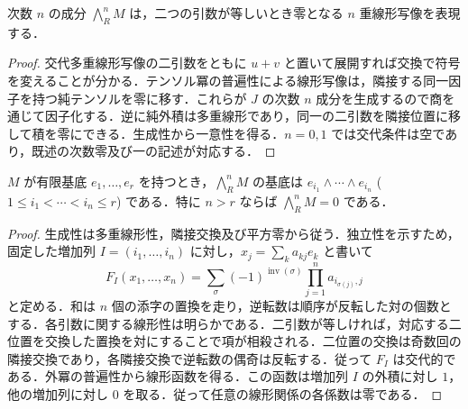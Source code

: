 \begin{prop}[外冪の普遍性]
次数 $n$ の成分 $\bigwedge_R^n M$ は，二つの引数が等しいとき零となる $n$ 重線形写像を表現する．
\end{prop}
\begin{proof}
交代多重線形写像の二引数をともに $u+v$ と置いて展開すれば交換で符号を変えることが分かる．テンソル冪の普遍性による線形写像は，隣接する同一因子を持つ純テンソルを零に移す．これらが $J$ の次数 $n$ 成分を生成するので商を通じて因子化する．逆に純外積は多重線形であり，同一の二引数を隣接位置に移して積を零にできる．生成性から一意性を得る．$n=0,1$ では交代条件は空であり，既述の次数零及び一の記述が対応する．
\end{proof}
\begin{prop}[自由加群の外冪の基底]
$M$ が有限基底 $e_1,\ldots,e_r$ を持つとき，$\bigwedge_R^n M$ の基底は $e_{i_1}\wedge\cdots\wedge e_{i_n}$ ($1\leq i_1<\cdots<i_n\leq r$) である．特に $n>r$ ならば $\bigwedge_R^n M=0$ である．
\end{prop}
\begin{proof}
生成性は多重線形性，隣接交換及び平方零から従う．独立性を示すため，固定した増加列 $I=(i_1,\ldots,i_n)$ に対し，$x_j=\sum_k a_{kj}e_k$ と書いて
\[
F_I(x_1,\ldots,x_n)=\sum_{\sigma}(-1)^{\operatorname{inv}(\sigma)}\prod_{j=1}^n a_{i_{\sigma(j)},j}
\]
と定める．和は $n$ 個の添字の置換を走り，逆転数は順序が反転した対の個数とする．各引数に関する線形性は明らかである．二引数が等しければ，対応する二位置を交換した置換を対にすることで項が相殺される．二位置の交換は奇数回の隣接交換であり，各隣接交換で逆転数の偶奇は反転する．従って $F_I$ は交代的である．外冪の普遍性から線形函数を得る．この函数は増加列 $I$ の外積に対し $1$，他の増加列に対し $0$ を取る．従って任意の線形関係の各係数は零である．
\end{proof}
